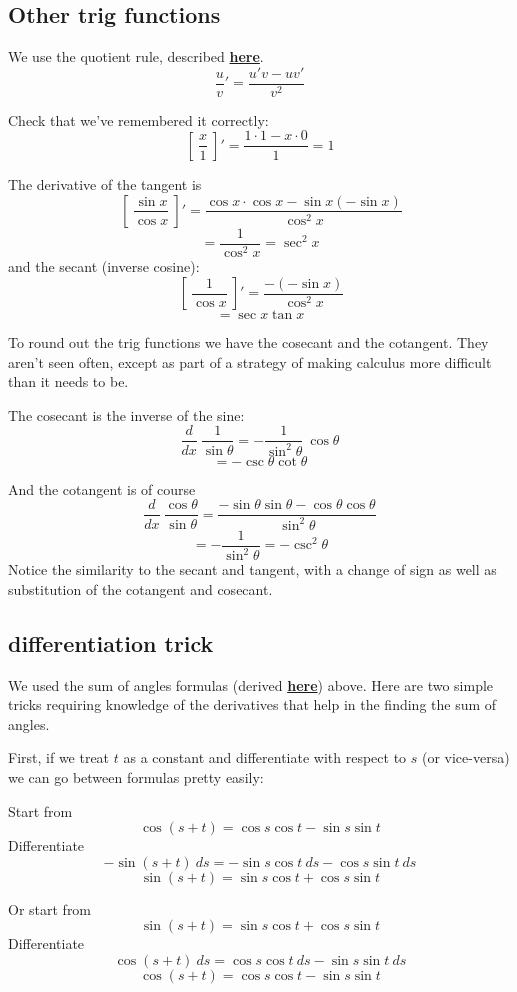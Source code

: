 \documentclass[11pt, oneside]{article}
\begin{document}
\subsection*{Other trig functions}

We use the quotient rule, described \hyperlink{quotient_rule}{\textbf{here}}.
\[ \frac{u}{v}' = \frac{u'v - uv'}{v^2} \]

Check that we've remembered it correctly:
\[ [ \ \frac{x}{1} \ ] ' = \frac{1 \cdot 1 - x \cdot 0}{1} = 1 \]

The derivative of the tangent is
\[ \ [ \ \frac{\sin x}{\cos x} \ ]' = \frac{\cos x \cdot \cos x - \sin x (- \sin x)}{\cos^2 x} \]
\[ = \frac{1}{\cos^2 x} = \sec^2 x \]
and the secant (inverse cosine):
\[ \ [ \ \frac{1}{\cos x} \ ] ' =  \frac{-(- \sin x)}{\cos^2 x}  \]
\[ = \sec x \tan x \]

To round out the trig functions we have the cosecant and the cotangent.  They aren't seen often, except as part of a strategy of making calculus more difficult than it needs to be.

The cosecant is the inverse of the sine:
\[ \frac{d}{dx} \ \frac{1}{\sin \theta} = - \frac{1}{\sin^2 \theta} \ \cos \theta \]
\[ = - \csc \theta \cot \theta \]

And the cotangent is of course
\[  \frac{d}{dx} \ \frac{\cos \theta}{\sin \theta} = \frac{- \sin \theta \sin \theta - \cos \theta \cos \theta}{\sin^2 \theta} \]
\[ = - \frac{1}{\sin^2 \theta} = - \csc^2 \theta \]
Notice the similarity to the secant and tangent, with a change of sign as well as substitution of the cotangent and cosecant.

\subsection*{differentiation trick}
We used the sum of angles formulas (derived \hyperref[sec:sum_angles_distance]{\textbf{here}}) above.  Here are two simple tricks requiring knowledge of the derivatives that help in the finding the sum of angles.

First, if we treat $t$ as a constant and differentiate with respect to $s$ (or vice-versa) we can go between formulas pretty easily:

Start from 
\[ \cos (s + t) = \cos s \cos t - \sin s \sin t \]
Differentiate
\[ -\sin (s + t) \ ds = - \sin s \cos t \ ds - \cos s \sin t \ ds \]
\[ \sin (s + t) = \sin s \cos t + \cos s \sin t \]

Or start from 
\[ \sin (s + t) = \sin s \cos t + \cos s \sin t \]
Differentiate
\[ \cos (s + t) \ ds = \cos s \cos t \ ds - \sin s \sin t \ ds \]
\[ \cos (s + t) = \cos s \cos t - \sin s \sin t \]
\end{document}
